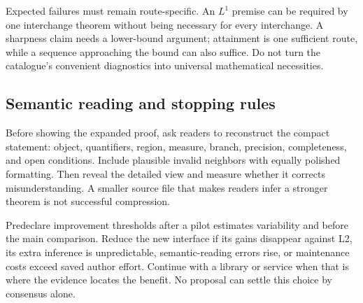 \documentclass[11pt,letterpaper]{article}
\theoremstyle{definition}\newtheorem{definition}[proposition]{Definition}
\theoremstyle{remark}\newtheorem{remark}[proposition]{Remark}
\begin{document}
Expected failures must remain route-specific. An $L^1$ premise can be required
by one interchange theorem without being necessary for every interchange.
A sharpness claim needs a lower-bound argument; attainment is one sufficient
route, while a sequence approaching the bound can also suffice. Do not turn
the catalogue's convenient diagnostics into universal mathematical necessities.

\subsection{Semantic reading and stopping rules}
Before showing the expanded proof, ask readers to reconstruct the compact
statement: object, quantifiers, region, measure, branch, precision, completeness,
and open conditions. Include plausible invalid neighbors with equally polished
formatting. Then reveal the detailed view and measure whether it corrects
misunderstanding. A smaller source file that makes readers infer a stronger
theorem is not successful compression.

Predeclare improvement thresholds after a pilot estimates variability and
before the main comparison. Reduce the new interface if its gains disappear
against L2, its extra inference is unpredictable, semantic-reading errors rise,
or maintenance costs exceed saved author effort. Continue with a library or
service when that is where the evidence locates the benefit. No proposal can
settle this choice by consensus alone.

\clearpage
\end{document}
